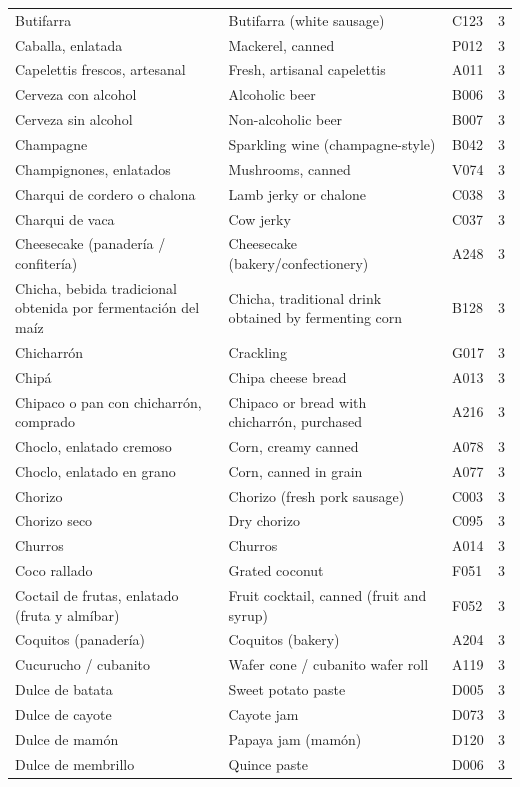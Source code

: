 {\begin{longtable}{p{4.3cm}p{5.5cm}p{1.5cm}p{0.7cm}}
Butifarra & Butifarra (white sausage) & C123 & 3\\
Caballa, enlatada & Mackerel, canned & P012 & 3\\
Capelettis frescos, artesanal & Fresh, artisanal capelettis & A011 & 3\\
Cerveza con alcohol & Alcoholic beer & B006 & 3\\
Cerveza sin alcohol & Non-alcoholic beer & B007 & 3\\
Champagne & Sparkling wine (champagne-style) & B042 & 3\\
Champignones, enlatados & Mushrooms, canned & V074 & 3\\
Charqui de cordero o chalona & Lamb jerky or chalone & C038 & 3\\
Charqui de vaca & Cow jerky & C037 & 3\\
Cheesecake (panadería / confitería) & Cheesecake (bakery/confectionery) & A248 & 3\\
Chicha, bebida tradicional obtenida por fermentación del maíz & Chicha, traditional drink obtained by fermenting corn & B128 & 3\\
Chicharrón & Crackling & G017 & 3\\
Chipá & Chipa cheese bread & A013 & 3\\
Chipaco o pan con chicharrón, comprado & Chipaco or bread with chicharrón, purchased & A216 & 3\\
Choclo, enlatado cremoso & Corn, creamy canned & A078 & 3\\
Choclo, enlatado en grano & Corn, canned in grain & A077 & 3\\
Chorizo & Chorizo (fresh pork sausage) & C003 & 3\\
Chorizo seco & Dry chorizo & C095 & 3\\
Churros & Churros & A014 & 3\\
Coco rallado & Grated coconut & F051 & 3\\
Coctail de frutas, enlatado (fruta y almíbar) & Fruit cocktail, canned (fruit and syrup) & F052 & 3\\
Coquitos (panadería) & Coquitos (bakery) & A204 & 3\\
Cucurucho / cubanito & Wafer cone / cubanito wafer roll & A119 & 3\\
Dulce de batata & Sweet potato paste & D005 & 3\\
Dulce de cayote & Cayote jam & D073 & 3\\
Dulce de mamón & Papaya jam (mamón) & D120 & 3\\
Dulce de membrillo & Quince paste & D006 & 3\\

\end{longtable}}

